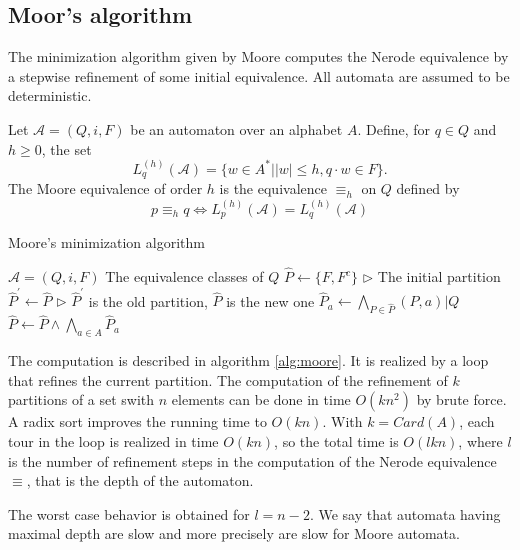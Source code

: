 \subsection{Moor's algorithm}

The minimization algorithm given by Moore computes the Nerode equivalence by a stepwise refinement of some initial equivalence. All automata are assumed to be deterministic.

\begin{definition}
	Let $\mathcal{A}=(Q,i,F)$ be an automaton over an alphabet $A$. Define, for $q\in Q$ and $h\ge 0$, the set 
	\[L_q^{(h)}(\mathcal{A})=\{w\in A^\ast||w|\le h, q\cdot w\in F \}. \]
	The Moore equivalence of order $h$ is the equivalence $\equiv_h$ on $Q$ defined by
	\[p\equiv_h q\Leftrightarrow L_p^{(h)}(\mathcal{A})=L_q^{(h)}(\mathcal{A})\]
\end{definition}

\begin{algorithm}  
	\caption{Moore's minimization algorithm}  \label{alg:moore}
	\begin{algorithmic}%
		\Require $\mathcal{A}=(Q,i,F)$  
		\Ensure The equivalence classes of $Q$  
		\State $\hat{P} \gets \{F,F^c \}$  \qquad\qquad $\triangleright$ The initial partition
		\Repeat
		\State $\hat{P}^\prime \gets \hat{P}$  \qquad\qquad $\triangleright$  $\hat{P}^\prime$ is the old partition, $\hat{P}$ is the new one
			\State $\hat{P}_a \gets \bigwedge_{P\in \hat{P}}(P,a)|Q$
		\EndFor
		\State $\hat{P}\gets \hat{P}\land \bigwedge_{a\in A}\hat{P}_a$
	\end{algorithmic}   
\end{algorithm}

The computation is described in algorithm \ref{alg:moore}. It is realized by a loop that refines the current partition. The computation of the refinement of $k$ partitions of a set swith $n$ elements can
be done in time $O(kn^2)$ by brute force. A radix sort improves the running time to $O(kn)$. With $k = Card(A)$, each tour in the loop is realized in time $O(kn)$, so the total time is $O(\mathit{l}kn)$, where $\mathit{l}$ is the number of refinement steps in the computation of the Nerode equivalence $\equiv$, that is the depth of the automaton.

The worst case behavior is obtained for $\mathit{l} = n − 2$. We say that automata having maximal depth are slow and more precisely are slow for Moore automata.

